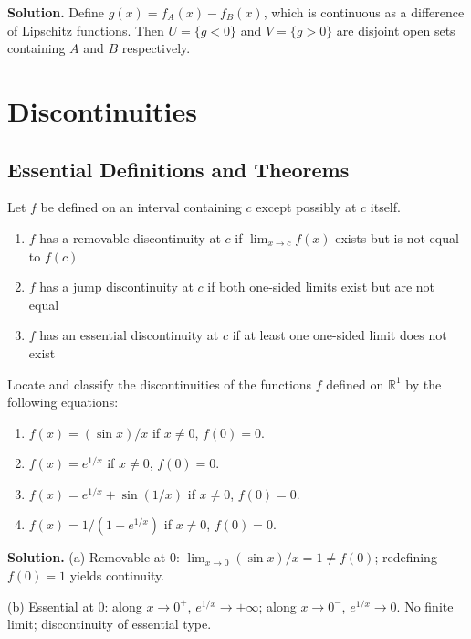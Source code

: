 \noindent\textbf{Solution.}
Define $g(x)=f_A(x)-f_B(x)$, which is continuous as a difference of Lipschitz functions. Then $U=\{g<0\}$ and $V=\{g>0\}$ are disjoint open sets containing $A$ and $B$ respectively.
\medskip

\section{Discontinuities}

\subsection*{Essential Definitions and Theorems}

\begin{definition}
Let $f$ be defined on an interval containing $c$ except possibly at $c$ itself.
\begin{enumerate}
\item $f$ has a removable discontinuity at $c$ if $\lim_{x \to c} f(x)$ exists but is not equal to $f(c)$
\item $f$ has a jump discontinuity at $c$ if both one-sided limits exist but are not equal
\item $f$ has an essential discontinuity at $c$ if at least one one-sided limit does not exist
\end{enumerate}
\end{definition}

\begin{problembox}
Locate and classify the discontinuities of the functions $f$ defined on $\mathbb{R}^1$ by the following equations:
\begin{enumerate}[label=(\alph*)]
\item $f(x) = (\sin x)/x$ if $x \neq 0$, $f(0) = 0$.
\item $f(x) = e^{1/x}$ if $x \neq 0$, $f(0) = 0$.
\item $f(x) = e^{1/x} + \sin(1/x)$ if $x \neq 0$, $f(0) = 0$.
\item $f(x) = 1/(1 - e^{1/x})$ if $x \neq 0$, $f(0) = 0$.
\end{enumerate}
\end{problembox}

\noindent\textbf{Solution.}
(a) Removable at $0$: $\lim_{x\to0}(\sin x)/x=1\ne f(0)$; redefining $f(0)=1$ yields continuity.

(b) Essential at $0$: along $x\to 0^+$, $e^{1/x}\to+\infty$; along $x\to0^-$, $e^{1/x}\to 0$. No finite limit; discontinuity of essential type.

